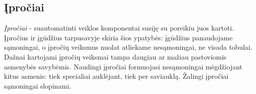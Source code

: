 \subsection{Įpročiai}

\emph{Įpročiai} - suautomatinti veiklos komponentai susiję su poreikiu juos
kartoti. Įpročius ir įgūdžius tarpusavyje skiria šios ypatybės: įgūdžius 
panaudojame sąmoningai, o įpročių veiksmus nuolat atliekame nesąmoningai, ne
visada tobulai. Dažnai kartojami įpročių veiksmai tampa daugiau ar mažiau
pastoviomis asmenybės savybėmis. Naudingi įpročiai formuojasi nesąmoningai
mėgdžiojant kitus asmenis: tiek specialiai auklėjant, tiek per saviauklą.
Žalingi įpročiai sąmoningai slopinami.

